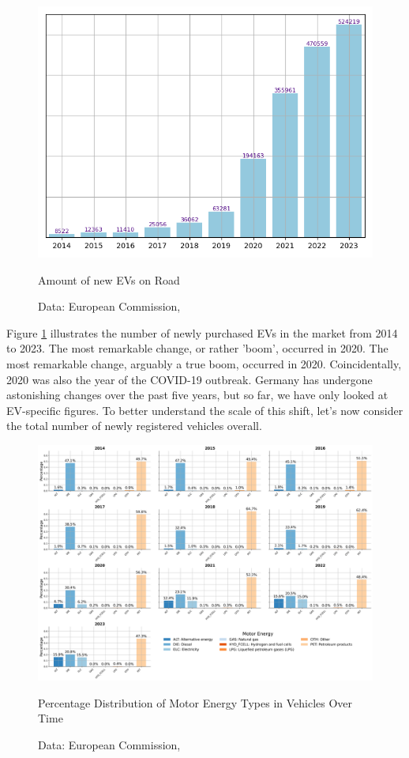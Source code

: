 \begin{figure}[H]
	\begin{center}
		\includegraphics[width=\linewidth]{images/EV_amount.png}
	\end{center}
	\caption{Amount of new EVs on Road}
	\label{fig: ev_market}
  	\caption*{Data: European Commission, \cite{Estat}} 
\end{figure}
Figure \ref{fig: ev_market} illustrates the number of newly purchased EVs in the market from 2014 to 2023. The most remarkable change, or rather 'boom', occurred in 2020. The most remarkable change, arguably a true boom, occurred in 2020. Coincidentally, 2020 was also the year of the COVID-19 outbreak. Germany has undergone astonishing changes over the past five years, but so far, we have only looked at EV-specific figures. To better understand the scale of this shift, let’s now consider the total number of newly registered vehicles overall.
\begin{figure}[H]
	\begin{center}
		\includegraphics[width=\linewidth]{images/Veh_Mark.png}
		\caption{Percentage Distribution of Motor Energy Types in Vehicles Over Time}
		\label{fig: vehicles_market}
  		\caption*{Data: European Commission, \cite{Estat}}
	\end{center}
\end{figure}
